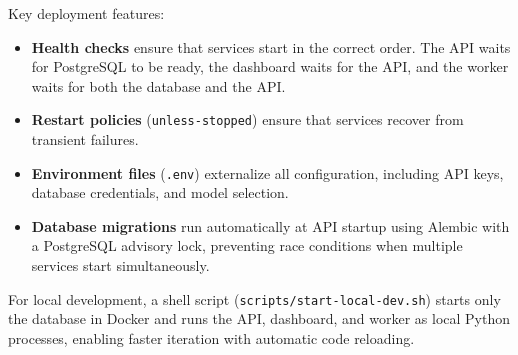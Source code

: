Key deployment features:

\begin{itemize}
    \item \textbf{Health checks} ensure that services start in the correct order. The API waits for PostgreSQL to be ready, the dashboard waits for the API, and the worker waits for both the database and the API.
    \item \textbf{Restart policies} (\texttt{unless-stopped}) ensure that services recover from transient failures.
    \item \begin{sloppypar}\textbf{Environment files} (\texttt{.env}) externalize all configuration, including API keys, database credentials, and model selection.\end{sloppypar}
    \item \textbf{Database migrations} run automatically at API startup using Alembic with a PostgreSQL advisory lock, preventing race conditions when multiple services start simultaneously.
\end{itemize}

For local development, a shell script (\texttt{scripts/start-local-dev.sh}) starts only the database in Docker and runs the API, dashboard, and worker as local Python processes, enabling faster iteration with automatic code reloading.
